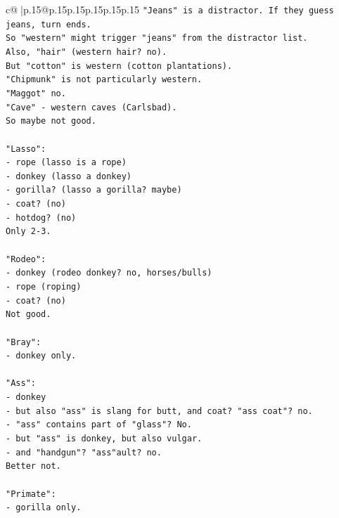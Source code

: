 \documentclass{article}
\begin{document}
{\begin{supertabular}{c@{$\;$}|p{.15\linewidth}@{}p{.15\linewidth}p{.15\linewidth}p{.15\linewidth}p{.15\linewidth}p{.15\linewidth}}
{{{\texttt{"Jeans" is a distractor. If they guess jeans, turn ends.} \\
\texttt{So "western" might trigger "jeans" from the distractor list.} \\
\texttt{Also, "hair" (western hair? no).} \\
\texttt{But "cotton" is western (cotton plantations).} \\
\texttt{"Chipmunk" is not particularly western.} \\
\texttt{"Maggot" no.} \\
\texttt{"Cave" {-} western caves (Carlsbad).} \\
\texttt{So maybe not good.} \\
\\ 
\texttt{"Lasso":} \\
\texttt{{-} rope (lasso is a rope)} \\
\texttt{{-} donkey (lasso a donkey)} \\
\texttt{{-} gorilla? (lasso a gorilla? maybe)} \\
\texttt{{-} coat? (no)} \\
\texttt{{-} hotdog? (no)} \\
\texttt{Only 2{-}3.} \\
\\ 
\texttt{"Rodeo":} \\
\texttt{{-} donkey (rodeo donkey? no, horses/bulls)} \\
\texttt{{-} rope (roping)} \\
\texttt{{-} coat? (no)} \\
\texttt{Not good.} \\
\\ 
\texttt{"Bray":} \\
\texttt{{-} donkey only.} \\
\\ 
\texttt{"Ass":} \\
\texttt{{-} donkey} \\
\texttt{{-} but also "ass" is slang for butt, and coat? "ass coat"? no.} \\
\texttt{{-} "ass" contains part of "glass"? No.} \\
\texttt{{-} but "ass" is donkey, but also vulgar.} \\
\texttt{{-} and "handgun"? "ass"ault? no.} \\
\texttt{Better not.} \\
\\ 
\texttt{"Primate":} \\
\texttt{{-} gorilla only.} \\
}}}
\end{supertabular}}
\end{document}
